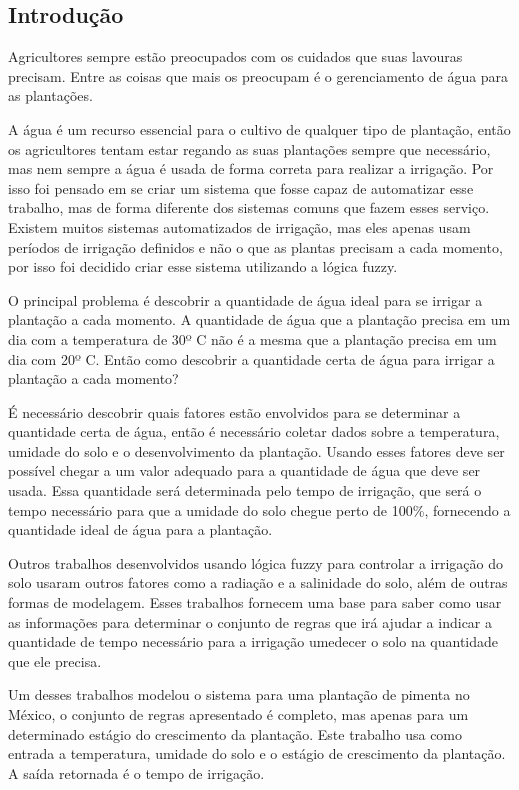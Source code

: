 \documentclass[
	article,			%
	11pt,				%
	oneside,			%
	a4paper,			%
	english,			%
	brazil,				%
	sumario=tradicional
	]{abntex2}
\begin{document}
\begin{multicols}{2}
\section{Introdução}

Agricultores sempre estão preocupados com os cuidados que suas lavouras precisam. Entre as coisas que mais os preocupam é o gerenciamento de água para as plantações.

A água é um recurso essencial para o cultivo de qualquer tipo de plantação, então os agricultores tentam estar regando as suas plantações sempre que necessário, mas nem sempre a água é usada de forma correta para realizar a irrigação. Por isso foi pensado em se criar um sistema que fosse capaz de automatizar esse trabalho, mas de forma diferente dos sistemas comuns que fazem esses serviço. Existem muitos sistemas automatizados de irrigação, mas eles apenas usam períodos de irrigação definidos e não o que as plantas precisam a cada momento, por isso foi decidido criar esse sistema utilizando a lógica fuzzy.

O principal problema é descobrir a quantidade de água ideal para se irrigar a plantação a cada momento. A quantidade de água que a plantação precisa em um dia com a temperatura de 30º C não é a mesma que a plantação precisa em um dia com 20º C. Então como descobrir a quantidade certa de água para irrigar a plantação a cada momento?

É necessário descobrir quais fatores estão envolvidos para se determinar a quantidade certa de água, então é necessário coletar dados sobre a temperatura, umidade do solo e o desenvolvimento da plantação. Usando esses fatores deve ser possível chegar a um valor adequado para a quantidade de água que deve ser usada. Essa quantidade será determinada pelo tempo de irrigação, que será o tempo necessário para que a umidade do solo chegue perto de 100\%, fornecendo a quantidade ideal de água para a plantação.

Outros trabalhos desenvolvidos usando lógica fuzzy para controlar a irrigação do solo usaram outros fatores como a radiação e a salinidade do solo, além de outras formas de modelagem. Esses trabalhos fornecem uma base para saber como usar as informações para determinar o conjunto de regras que irá ajudar a indicar a quantidade de tempo necessário para a irrigação umedecer o solo na quantidade que ele precisa.

Um desses trabalhos modelou o sistema para uma plantação de pimenta no México, o conjunto de regras apresentado é completo, mas apenas para um determinado estágio do crescimento da plantação. Este trabalho usa como entrada a temperatura, umidade do solo e o estágio de crescimento da plantação. A saída retornada é o tempo de irrigação.


\end{multicols}
\end{document}
